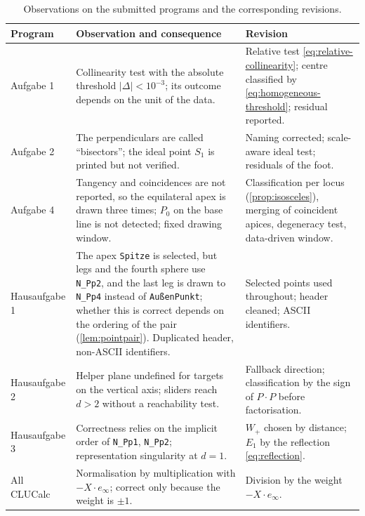 \documentclass[11pt,a4paper]{article}
\theoremstyle{plain}
\theoremstyle{definition}
\theoremstyle{remark}
\newcommand{\einf}{e_{\infty}}
\newcommand{\abs}[1]{\left\lvert#1\right\rvert}
\begin{document}
\begin{table}[H]
  \centering
  \caption[Audit of the submitted programs]{Observations on the submitted programs and the corresponding
  revisions.}
  \label{tab:audit}
  \footnotesize
  \begin{tabularx}{\textwidth}{@{}>{\raggedright\arraybackslash}p{21mm}YY@{}}
    \toprule
    Program & Observation and consequence & Revision \\
    \midrule
    Aufgabe 1 & Collinearity test with the absolute threshold $\abs{\Delta}<10^{-3}$; its outcome depends on the unit of the data. & Relative test \cref{eq:relative-collinearity}; centre classified by \cref{eq:homogeneous-threshold}; residual reported. \\
    Aufgabe 2 & The perpendiculars are called ``bisectors''; the ideal point $S_1$ is printed but not verified. & Naming corrected; scale-aware ideal test; residuals of the foot. \\
    Aufgabe 4 & Tangency and coincidences are not reported, so the equilateral apex is drawn three times; $P_0$ on the base line is not detected; fixed drawing window. & Classification per locus (\cref{prop:isosceles}), merging of coincident apices, degeneracy test, data-driven window. \\
    Hausaufgabe 1 & The apex \texttt{Spitze} is selected, but legs and the fourth sphere use \texttt{N\_Pp2}, and the last leg is drawn to \texttt{N\_Pp4} instead of \texttt{AußenPunkt}; whether this is correct depends on the ordering of the pair (\cref{lem:pointpair}). Duplicated header, non-ASCII identifiers. & Selected points used throughout; header cleaned; ASCII identifiers. \\
    Hausaufgabe 2 & Helper plane undefined for targets on the vertical axis; sliders reach $d>2$ without a reachability test. & Fallback direction; classification by the sign of $P\cdot P$ before factorisation. \\
    Hausaufgabe 3 & Correctness relies on the implicit order of \texttt{N\_Pp1}, \texttt{N\_Pp2}; representation singularity at $d=1$. & $W_+$ chosen by distance; $E_1$ by the reflection \cref{eq:reflection}. \\
    All CLUCalc & Normalisation by multiplication with $-X\cdot\einf$; correct only because the weight is $\pm1$. & Division by the weight $-X\cdot\einf$. \\
    \bottomrule
  \end{tabularx}
\end{table}
\end{document}
